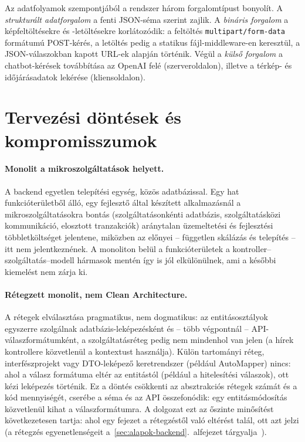 Az adatfolyamok szempontjából a rendszer három forgalomtípust bonyolít. A \emph{strukturált
adatforgalom} a fenti JSON-séma szerint zajlik. A \emph{bináris forgalom} a képfeltöltésekre és
-letöltésekre korlátozódik: a feltöltés \texttt{multipart/form-data} formátumú POST-kérés, a
letöltés pedig a statikus fájl-middleware-en keresztül, a JSON-válaszokban kapott URL-ek alapján
történik. Végül a \emph{külső forgalom} a chatbot-kérések továbbítása az OpenAI felé
(szerveroldalon), illetve a térkép- és időjárásadatok lekérése (kliensoldalon).

\section{Tervezési döntések és kompromisszumok}
\label{sec:arch-dontesek}

\paragraph{Monolit a mikroszolgáltatások helyett.} A backend egyetlen telepítési egység, közös
adatbázissal. Egy hat funkcióterületből álló, egy fejlesztő által készített alkalmazásnál a
mikroszolgáltatásokra bontás (szolgáltatásonkénti adatbázis, szolgáltatásközi kommunikáció,
elosztott tranzakciók) aránytalan üzemeltetési és fejlesztési többletköltséget jelentene,
miközben az előnyei -- független skálázás és telepítés -- itt nem jelentkeznének. A monoliton
belül a funkcióterületek a kontroller--szolgáltatás--modell hármasok mentén így is jól
elkülönülnek, ami a későbbi kiemelést nem zárja ki.

\paragraph{Rétegzett monolit, nem Clean Architecture.} A rétegek elválasztása pragmatikus, nem
dogmatikus: az entitásosztályok egyszerre szolgálnak adatbázis-leképezésként és -- több végpontnál
-- API-válaszformátumként, a szolgáltatásréteg pedig nem mindenhol van jelen (a hírek kontrollere
közvetlenül a kontextust használja). Külön tartományi réteg, interfészprojekt vagy
DTO-leképező keretrendszer (például AutoMapper) nincs: ahol a válasz formátuma eltér az
entitástól (például a hitelesítési válaszok), ott kézi leképezés történik. Ez a döntés
csökkenti az absztrakciós rétegek számát és a kód mennyiségét, cserébe a séma és az API
összefonódik: egy entitásmódosítás közvetlenül kihat a válaszformátumra. A dolgozat ezt az
őszinte minősítést következetesen tartja: ahol egy fejezet a rétegzéstől való eltérést talál,
ott azt jelzi (a rétegzés egyenetlenségeit a~\ref{sec:alapok-backend}.~alfejezet
tárgyalja~\cite{fowler2002}).

